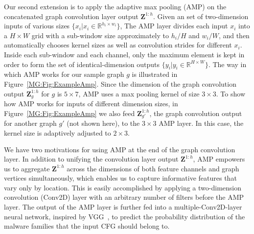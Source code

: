 Our second extension is to apply the adaptive max pooling (AMP) on the concatenated graph convolution layer output $\mathbf{Z}^{1:h}$.
Given an set of two-dimension inputs of various sizes $\{x_i | x_i \in \mathbb{R}^{h_i \times w_i}\}$,
The AMP layer divides each input $x_i$ into a $H \times W$ grid with a sub-window size approximately to $h_i / H$ and $w_i / W$,
and then automatically chooses kernel sizes as well as convolution strides for different $x_i$.
Inside each sub-window and each channel, only the maximum element is kept in order to form the set of identical-dimension outputs $\{y_i | y_i \in \mathbb{R}^{ H \times W}\}$.
The way in which AMP works for our sample graph $g$ is illustrated in Figure~\ref{MG:Fig:ExampleAmp}.
Since the dimension of the graph convolution output $\mathbf{Z}^{1:h}_g$ for $g$ is $5 \times 7$, AMP uses a max pooling kernel of size $3 \times 3$.
To show how AMP works for inputs of different dimension sizes, in Figure~\ref{MG:Fig:ExampleAmp} we also feed $\mathbf{Z}^{1:h}_{g'}$, the graph convolution output for another graph $g'$ (not shown here), to the $3 \times 3$ AMP layer. In this case, the kernel size is adaptively adjusted to $2 \times 3$.

We have two motivations for using AMP at the end of the graph convolution layer.
In addition to unifying the convolution layer output $\mathbf{Z}^{1:h}$, AMP empowers us to aggregate $\mathbf{Z}^{1:h}$
across the dimensions of both feature channels and graph vertices simultaneously,
which enables us to capture informative features that vary only by location.
This is easily accomplished by applying a two-dimension convolution (Conv2D) layer with an arbitrary number of filters before the AMP layer.
The output of the AMP layer is further fed into a multiple-Conv2D-layer neural network, inspired by VGG~\cite{VGG}, to predict the probability distribution of the malware families that the input CFG should belong to.


